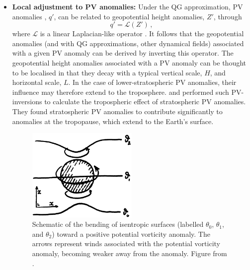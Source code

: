 \begin{itemize}
\item\textbf{Local adjustment to PV anomalies:} Under the QG approximation, PV
  anomalies , $q'$, can be related to geopotential height anomalies, $Z'$,
  through
  \begin{equation}
    q' = \mathcal{L}(Z')\, ,
  \end{equation}
  where $\mathcal{L}$ is a linear Laplacian-like operator
  \citep{Charney1962}. It follows that the geopotential anomalies (and with QG
  approximations, other dynamical fields) associated with a given PV anomaly can
  be derived by inverting this operator. The geopotential height anomalies
  associated with a PV anomaly can be thought to be localised in that they decay
  with a typical vertical scale, $H$, and horizontal scale, $L$. In the case of
  lower-stratospheric PV anomalies, their influence may therefore extend to the
  troposphere. \citet{Hartley1998} and \citet{Black2002} performed such
  PV-inversions to calculate the tropospheric effect of stratospheric PV
  anomalies. They found stratospheric PV anomalies to contribute significantly
  to anomalies at the tropopause, which extend to the Earth's surface.

  \begin{figure}
    \centering
    \noindent\includegraphics[width=0.5\textwidth]{figures/chapter-intro/ambaum_hoskins.png}
    \caption[Schematic from \citet{Ambaum2002}]{Schematic of the bending of
      isentropic surfaces (labelled $\theta_0$, $\theta_1$, and $\theta_2$)
      toward a positive potential vorticity anomaly. The arrows represent winds
      associated with the potential vorticity anomaly, becoming weaker away from
      the anomaly. Figure from \citet{Ambaum2002}.}
    \label{fig:ambaum_hoskins}
  \end{figure}


\end{itemize}
